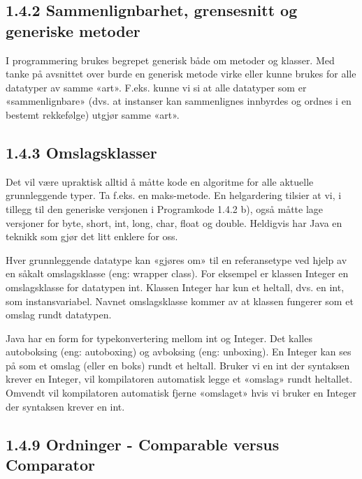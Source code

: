 \documentclass[11pt]{article}
\begin{document}
    \subsection{1.4.2 Sammenlignbarhet, grensesnitt og generiske metoder}
        I programmering brukes begrepet generisk både om metoder og klasser. Med tanke på
        avsnittet over burde en generisk metode virke eller kunne brukes for alle datatyper av samme
        «art». F.eks. kunne vi si at alle datatyper som er «sammenlignbare» (dvs. at instanser kan
        sammenlignes innbyrdes og ordnes i en bestemt rekkefølge) utgjør samme «art». 
    
    \subsection{1.4.3 Omslagsklasser}
        Det vil være upraktisk alltid å måtte kode en algoritme for alle aktuelle grunnleggende typer.
        Ta f.eks. en maks-metode. En helgardering tilsier at vi, i tillegg til den generiske versjonen i
        Programkode 1.4.2 b), også måtte lage versjoner for byte, short, int, long, char, float og
        double. Heldigvis har Java en teknikk som gjør det litt enklere for oss.

        Hver grunnleggende datatype kan «gjøres om» til en referansetype ved hjelp av en såkalt
        omslagsklasse (eng: wrapper class). For eksempel er klassen Integer en omslagsklasse for
        datatypen int. Klassen Integer har kun et heltall, dvs. en int, som instansvariabel. Navnet
        omslagsklasse kommer av at klassen fungerer som et omslag rundt datatypen.

        Java har en form for typekonvertering mellom int og Integer. Det kalles autoboksing (eng:
        autoboxing) og avboksing (eng: unboxing). En Integer kan ses på som et omslag (eller en
        boks) rundt et heltall. Bruker vi en int der syntaksen krever en Integer, vil kompilatoren
        automatisk legge et «omslag» rundt heltallet. Omvendt vil kompilatoren automatisk fjerne
        «omslaget» hvis vi bruker en Integer der syntaksen krever en int. 

    \subsection{1.4.9 Ordninger - Comparable versus Comparator}
\end{document}
